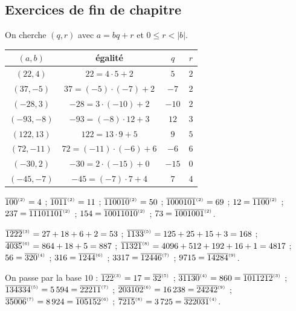 \begin{corrige}
\subsection*{Exercices de fin de chapitre}
%
\begin{sol}
On cherche $(q, r)$ avec $a = bq + r$ et $0 \leq r < |b|$.
\begin{center}
\begin{tabular}{|c|c|c|c|}
\hline $(a,b)$ & \'egalit\'e & $q$ & $r$ \\ \hline
$(22,4)$ & $22 = 4 \cdot 5 + 2$ & $5$ & $2$ \\
$(37,-5)$ & $37 = (-5)\cdot(-7) + 2$ & $-7$ & $2$ \\
$(-28,3)$ & $-28 = 3 \cdot (-10) + 2$ & $-10$ & $2$ \\
$(-93,-8)$ & $-93 = (-8) \cdot 12 + 3$ & $12$ & $3$ \\
$(122,13)$ & $122 = 13 \cdot 9 + 5$ & $9$ & $5$ \\
$(72,-11)$ & $72 = (-11)\cdot(-6) + 6$ & $-6$ & $6$ \\
$(-30,2)$ & $-30 = 2 \cdot (-15) + 0$ & $-15$ & $0$ \\
$(-45,-7)$ & $-45 = (-7) \cdot 7 + 4$ & $7$ & $4$ \\ \hline
\end{tabular}
\end{center}
\end{sol}
%
\begin{sol}
$\overline{100}^{_{(2)}} = 4$ ; $\overline{1011}^{_{(2)}} = 11$ ; $\overline{110010}^{_{(2)}} = 50$ ; $\overline{1000101}^{_{(2)}} = 69$ ;
$12 = \overline{1100}^{_{(2)}}$ ; $237 = \overline{11101101}^{_{(2)}}$ ; $154 = \overline{10011010}^{_{(2)}}$ ; $73 = \overline{1001001}^{_{(2)}}$.
\end{sol}
%
\begin{sol}
$\overline{1222}^{_{(3)}} = 27 + 18 + 6 + 2 = 53$ ; $\overline{1133}^{_{(5)}} = 125 + 25 + 15 + 3 = 168$ ;
$\overline{4035}^{_{(6)}} = 864 + 18 + 5 = 887$ ; $\overline{11321}^{_{(8)}} = 4096 + 512 + 192 + 16 + 1 = 4817$ ;
$56 = \overline{320}^{_{(4)}}$ ; $316 = \overline{1244}^{_{(6)}}$ ; $3317 = \overline{12446}^{_{(7)}}$ ; $9715 = \overline{14284}^{_{(9)}}$.
\end{sol}
%
\begin{sol}
On passe par la base $10$ :
$\overline{122}^{_{(3)}} = 17 = \overline{32}^{_{(5)}}$ ;
$\overline{31130}^{_{(4)}} = 860 = \overline{1011212}^{_{(3)}}$ ;
$\overline{134334}^{_{(5)}} = 5\,594 = \overline{22211}^{_{(7)}}$ ;
$\overline{203102}^{_{(6)}} = 16\,238 = \overline{24242}^{_{(9)}}$ ;
$\overline{35006}^{_{(7)}} = 8\,924 = \overline{105152}^{_{(6)}}$ ;
$\overline{7215}^{_{(8)}} = 3\,725 = \overline{322031}^{_{(4)}}$.

\end{sol}
\end{corrige}
